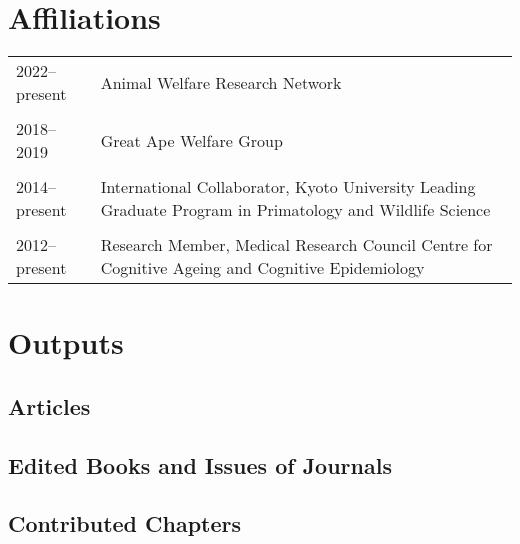 \documentclass[11pt]{article}
\begin{document}
\section*{Affiliations}

\begin{tabular}{p{3cm}p{12cm}}
2022--present & Animal Welfare Research Network \\ \\

2018--2019 & Great Ape Welfare Group \\ \\

2014--present & International Collaborator, Kyoto University Leading Graduate Program in
Primatology and Wildlife Science \\ \\

2012--present & Research Member, Medical Research Council Centre for
Cognitive Ageing and Cognitive Epidemiology
\end{tabular}

\newpage

\section*{Outputs}
\subsection*{Articles}

\nocite{*}

\setlength\bibhang{0pt}

\printbibliography[type=article,notkeyword=reviewrevision,heading=none]

\subsection*{Edited Books and Issues of Journals}

\printbibliography[keyword=editor,notkeyword=reviewrevision,heading=none]

\subsection*{Contributed Chapters}

\printbibliography[type=inbook,notkeyword=reviewrevision,heading=none]

\end{document}
